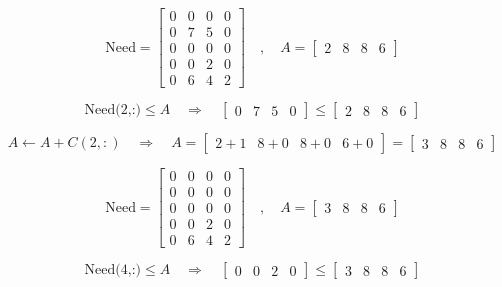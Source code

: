 \vspace{0.5cm}
\[\text{Need} = \left[\begin{matrix} 0 & 0 & 0 & 0 \\
                             0 & 7 & 5 & 0\\
                             0 & 0 & 0 & 0\\
                             0 & 0 & 2 & 0\\
                     0 & 6 & 4 & 2\end{matrix}\right]\quad,\quad
A =\left[\begin{matrix} 2 & 8  & 8 & 6   \end{matrix}\right] 
\]

\[ \text{Need(2,:)} \leq A \quad \Longrightarrow \quad
\left[\begin{matrix} 0& 7  & 5 & 0   \end{matrix}\right] \leq
 \left[\begin{matrix} 2 & 8  & 8 & 6   \end{matrix}\right] \]

\[A \gets A + C(2,:)\quad \Longrightarrow \quad A = \left[\begin{matrix} 2+1 & 8+0  & 8+0 & 6+0  \end{matrix}\right] = 
 \left[\begin{matrix} 3 & 8  & 8 & 6  \end{matrix}\right]\]

\vspace{0.5cm}
\[\text{Need} = \left[\begin{matrix} 0 & 0 & 0 & 0 \\
                             0 & 0 & 0 & 0\\
                             0 & 0 & 0 & 0\\
                             0 & 0 & 2 & 0\\
                     0 & 6 & 4 & 2\end{matrix}\right]\quad,\quad
A =\left[\begin{matrix} 3 & 8  & 8 & 6   \end{matrix}\right] 
\]

\[ \text{Need(4,:)} \leq A \quad \Longrightarrow \quad
\left[\begin{matrix} 0& 0  &2 & 0   \end{matrix}\right] \leq
 \left[\begin{matrix} 3 & 8  & 8 & 6   \end{matrix}\right] \]

